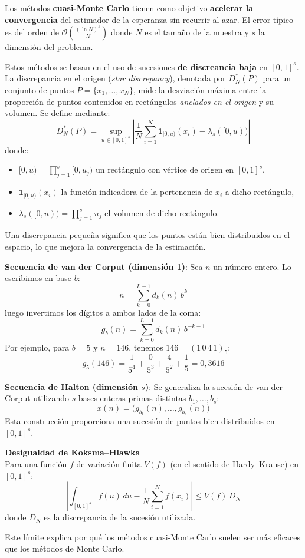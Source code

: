 %
\begin{f}
	
	Los métodos \textbf{cuasi-Monte Carlo} tienen como objetivo \textbf{acelerar la convergencia} del estimador de la esperanza sin recurrir al azar. El error típico es del orden de
	\(\displaystyle
	\mathcal{O}\left( \frac{(\ln N)^s}{N} \right)
	\)
	donde \(N\) es el tamaño de la muestra y \(s\) la dimensión del problema.
	
	Estos métodos se basan en el uso de sucesiones \textbf{de discreancia baja} en \([0,1]^s\). La discrepancia en el origen (\emph{star discrepancy}), denotada por \(D^*_N(P)\) para un conjunto de puntos \(P = \{x_1, \ldots, x_N\}\), mide la desviación máxima entre la proporción de puntos contenidos en rectángulos \emph{anclados en el origen} y su volumen. Se define mediante:
	\[
	D^*_N(P) = \sup_{u \in [0,1]^s} \left| \frac{1}{N} \sum_{i=1}^N \mathbf{1}_{[0,u)}(x_i) - \lambda_s([0,u)) \right|
	\]
	donde:
	\begin{itemize}
		\item \([0,u) = \prod_{j=1}^s [0, u_j)\) un rectángulo con vértice de origen en \([0,1]^s\),
		\item \(\mathbf{1}_{[0,u)}(x_i)\) la función indicadora de la pertenencia de \(x_i\) a dicho rectángulo,
		\item \(\lambda_s([0,u)) = \prod_{j=1}^s u_j\) el volumen de dicho rectángulo.
	\end{itemize}
	Una discrepancia pequeña significa que los puntos están bien distribuidos en el espacio, lo que mejora la convergencia de la estimación.
	
	\medskip
	\textbf{Secuencia de van der Corput (dimensión 1)}:
	Sea \(n\) un número entero. Lo escribimos en base \(b\):
	\[
	n = \sum_{k=0}^{L-1} d_k(n)\, b^k
	\]
	luego invertimos los dígitos a ambos lados de la coma:
	\[
	g_b(n) = \sum_{k=0}^{L-1} d_k(n)\, b^{-k-1}
	\]
	Por ejemplo, para \(b = 5\) y \(n = 146\), tenemos \(146 = (1\,0\,4\,1)_5\):
	\[
	g_5(146) = \frac{1}{5^4} + \frac{0}{5^3} + \frac{4}{5^2} + \frac{1}{5} = 0{,}3616
	\]
	
	\medskip
	\textbf{Secuencia de Halton (dimensión \(s\))}:
	Se generaliza la sucesión de van der Corput utilizando \(s\) bases enteras primas distintas \(b_1, \dots, b_s\):
	\[
	x(n) = \big( g_{b_1}(n), \dots, g_{b_s}(n) \big)
	\]
	Esta construcción proporciona una sucesión de puntos bien distribuidos en \([0,1]^s\).
	
	\medskip
	\textbf{Desigualdad de Koksma–Hlawka}\\
	Para una función \(f\) de variación finita \(V(f)\) (en el sentido de Hardy–Krause) en \([0,1]^s\):
	\[
	\left| \int_{[0,1]^s} f(u)\, du - \frac{1}{N} \sum_{i=1}^N f(x_i) \right| \leq V(f)\, D_N
	\]
	donde \(D_N\) es la discrepancia de la sucesión utilizada.
	
	Este límite explica por qué los métodos cuasi-Monte Carlo suelen ser más eficaces que los métodos de Monte Carlo.
	
	
\end{f}

